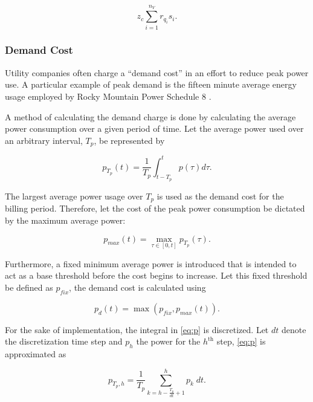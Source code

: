 \documentclass[energies,article,submit,moreauthors]{Definitions/mdpi}
\begin{document}
\begin{equation}
\label{eq:consumption-cost}
z_c \sum_{i=1}^{n_V} r_{q_i}s_i\text{.}
\end{equation}

\subsubsection{Demand Cost}
\label{sec:sa-demand-cost}
Utility companies often charge a ``demand cost'' in an effort to reduce peak power use. A particular example of peak
demand is the fifteen minute average energy usage employed by Rocky Mountain Power Schedule 8
\cite{rocky-mountain-power}.

A method of calculating the demand charge is done by calculating the average power consumption over a given period of
time. Let the average power used over an arbitrary interval, \(T_p\), be represented by

\begin{equation}
\label{eq:p}
p_{T_p}(t) = \frac{1}{T_p} \int_{t-T_p}^{t} p(\tau) d\tau\text{.}
\end{equation}

The largest average power usage over \(T_p\) is used as the demand cost for the billing period. Therefore, let the cost of
the peak power consumption be dictated by the maximum average power:

\begin{equation}
\label{eq:pmax}
p_{max}(t) = \max\limits_{\tau \in [0,t]}p_{T_p}(\tau)\text{.}
\end{equation}

Furthermore, a fixed minimum average power is introduced that is intended to act as a base threshold before the cost
begins to increase. Let this fixed threshold be defined as \(p_{fix}\), the demand cost is calculated using

\begin{equation}
\label{eq:pdem}
p_d(t) = \max(p_{fix},p_{max}(t))\text{.}
\end{equation}

For the sake of implementation, the integral in \ref{eq:p} is discretized. Let \(dt\) denote the discretization time step and
\(p_h\) the power for the \(h^{\text{th}}\) step, \ref{eq:p} is approximated as

\begin{equation}
p_{T_p,h} = \frac{1}{T_p} \sum_{k = h-\frac{T_p}{dt}+1}^h p_k\; dt\text{.}
\end{equation}
\end{document}
